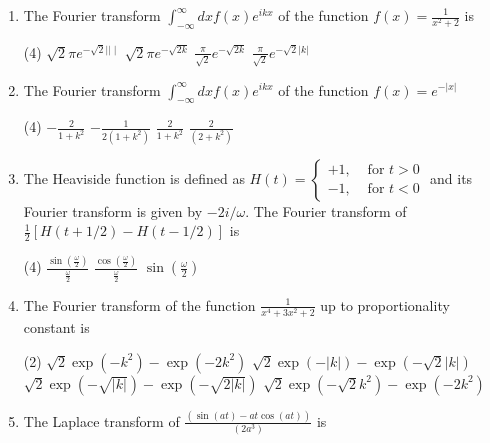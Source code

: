 \begin{enumerate}
\begin{tasks}(4)
\task[\textbf{A.}]  $\frac{1}{1-i k}$
\task[\textbf{B.}] $\frac{1}{1+i k}$
\task[\textbf{C.}] $\frac{1}{k+i}$
\task[\textbf{D.}] $\frac{1}{k-i}$
\end{tasks}
\item The Fourier transform $\int_{-\infty}^{\infty} d x f(x) e^{i k x}$ of the function $f(x)=\frac{1}{x^{2}+2}$ is
{}

\begin{tasks}(4)
\task[\textbf{A.}] $\sqrt{2} \pi e^{-\sqrt{2}|| \mid}$
\task[\textbf{B.}] $\sqrt{2} \pi e^{-\sqrt{2 k}}$
\task[\textbf{C.}] $\frac{\pi}{\sqrt{2}} e^{-\sqrt{2 k}}$
\task[\textbf{D.}] $\frac{\pi}{\sqrt{2}} e^{-\sqrt{2}|k|}$
\end{tasks}

\item The Fourier transform $\int_{-\infty}^{\infty} d x f(x) e^{i k x}$ of the function $f(x)=e^{-|x|}$
{}

\begin{tasks}(4)
\task[\textbf{A.}] $-\frac{2}{1+k^{2}}$
\task[\textbf{B.}] $-\frac{1}{2\left(1+k^{2}\right)}$
\task[\textbf{C.}] $\frac{2}{1+k^{2}}$
\task[\textbf{D.}] $\frac{2}{\left(2+k^{2}\right)}$
\end{tasks}
\item The Heaviside function is defined as $H(t)=\left\{\begin{array}{ll}+1, & \text { for } t>0 \\ -1, & \text { for } t<0\end{array}\right.$ and its Fourier transform is given by $-2 i / \omega$. The Fourier transform of $\frac{1}{2}[H(t+1 / 2)-H(t-1 / 2)]$ is
{}

\begin{tasks}(4)
\task[\textbf{A.}] $\frac{\sin \left(\frac{\omega}{2}\right)}{\frac{\omega}{2}}$
\task[\textbf{B.}]  $\frac{\cos \left(\frac{\omega}{2}\right)}{\frac{\omega}{2}}$
\task[\textbf{C.}] $\sin \left(\frac{\omega}{2}\right)$
\end{tasks}
\item The Fourier transform of the function $\frac{1}{x^{4}+3 x^{2}+2}$ up to proportionality constant is
{}

\begin{tasks}(2)
\task[\textbf{A.}] $\sqrt{2} \exp \left(-k^{2}\right)-\exp \left(-2 k^{2}\right)$
\task[\textbf{B.}]$\sqrt{2} \exp (-|k|)-\exp (-\sqrt{2}|k|)$
\task[\textbf{C.}] $\sqrt{2} \exp (-\sqrt{|k|})-\exp (-\sqrt{2|k|})$
\task[\textbf{D.}]$\sqrt{2} \exp \left(-\sqrt{2} k^{2}\right)-\exp \left(-2 k^{2}\right)$
\end{tasks}
\item The Laplace transform of $\frac{(\sin (a t)-a t \cos (a t))}{\left(2 a^{3}\right)}$ is 
{}


\end{enumerate}
